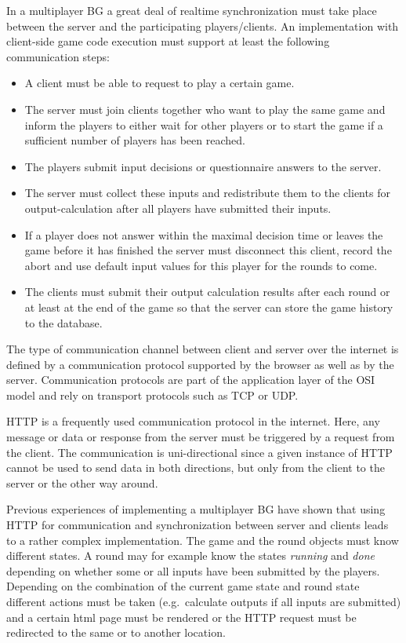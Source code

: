 In a multiplayer BG a great deal of realtime synchronization must take place between the server and the participating players/clients. An implementation with client-side game code execution must support at least the following communication steps:
\begin{itemize}
\item A client must be able to request to play a certain game.
\item The server must join clients together who want to play the same game and inform the players to either wait for other players or to start the game if a sufficient number of players has been reached.
\item The players submit input decisions or questionnaire answers to the server.
\item The server must collect these inputs and redistribute them to the clients for output-calculation after all players have submitted their inputs. 
\item If a player does not answer within the maximal decision time or leaves the game before it has finished the server must disconnect this client, record the abort and use default input values for this player for the rounds to come.
\item The clients must submit their output calculation results after each round or at least at the end of the game so that the server can store the game history to the database.
\end{itemize}

The type of communication channel between client and server over the internet is defined by a communication protocol supported by the browser as well as by the server. Communication protocols are part of the application layer of the OSI model and rely on transport protocols such as TCP or UDP. 

HTTP is a frequently used communication protocol in the internet. Here, any message or data or response from the server must be triggered by a request from the client. The communication is uni-directional since a given instance of HTTP cannot be used to send data in both directions, but only from the client to the server or the other way around.

Previous experiences of implementing a multiplayer BG \cite{saltseller} have shown that using HTTP for communication and synchronization between server and clients leads to a rather complex implementation. The game and the round objects must know different states. A round may for example know the states \textit{running} and \textit{done} depending on whether some or all inputs have been submitted by the players. Depending on the combination of the current game state and round state different actions must be taken (e.g.~calculate outputs if all inputs are submitted) and a certain html page must be rendered or the HTTP request must be redirected to the same or to another location.

